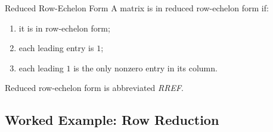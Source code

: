 \begin{definitionbox}{Reduced Row-Echelon Form}
A matrix is in reduced row-echelon form if:
\begin{enumerate}
    \item it is in row-echelon form;
    \item each leading entry is \(1\);
    \item each leading \(1\) is the only nonzero entry in its column.
\end{enumerate}
\end{definitionbox}

Reduced row-echelon form is abbreviated \emph{RREF}.

\subsection{Worked Example: Row Reduction}
\label{subsec:worked-row-reduction}

